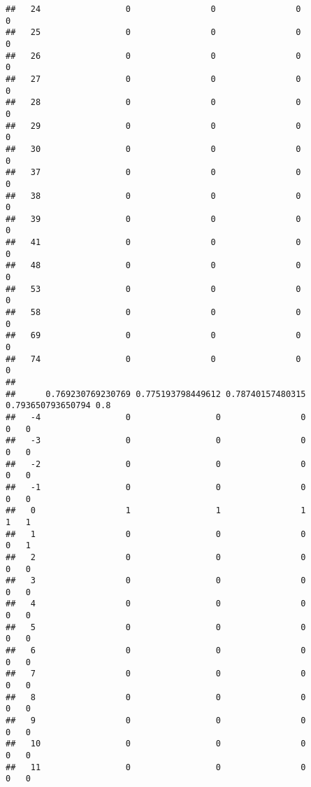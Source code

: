\documentclass[]{article}
\begin{document}
\begin{verbatim}
##   24                 0                0                0                 0
##   25                 0                0                0                 0
##   26                 0                0                0                 0
##   27                 0                0                0                 0
##   28                 0                0                0                 0
##   29                 0                0                0                 0
##   30                 0                0                0                 0
##   37                 0                0                0                 0
##   38                 0                0                0                 0
##   39                 0                0                0                 0
##   41                 0                0                0                 0
##   48                 0                0                0                 0
##   53                 0                0                0                 0
##   58                 0                0                0                 0
##   69                 0                0                0                 0
##   74                 0                0                0                 0
##     
##      0.769230769230769 0.775193798449612 0.78740157480315 0.793650793650794 0.8
##   -4                 0                 0                0                 0   0
##   -3                 0                 0                0                 0   0
##   -2                 0                 0                0                 0   0
##   -1                 0                 0                0                 0   0
##   0                  1                 1                1                 1   1
##   1                  0                 0                0                 0   1
##   2                  0                 0                0                 0   0
##   3                  0                 0                0                 0   0
##   4                  0                 0                0                 0   0
##   5                  0                 0                0                 0   0
##   6                  0                 0                0                 0   0
##   7                  0                 0                0                 0   0
##   8                  0                 0                0                 0   0
##   9                  0                 0                0                 0   0
##   10                 0                 0                0                 0   0
##   11                 0                 0                0                 0   0

\end{verbatim}
\end{document}
